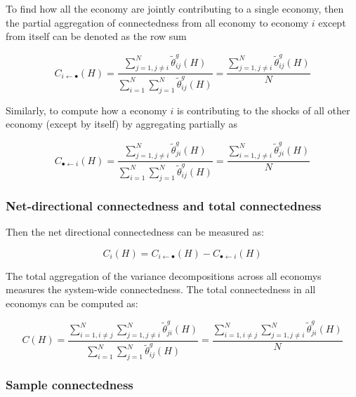 \documentclass[]{elsarticle} %
\begin{document}
To find how all the economy are jointly contributing to a single
economy, then the partial aggregation of connectedness from all economy
to economy \(i\) except from itself can be denoted as the row sum

\[{{C}_{i\leftarrow \bullet }}\left( H \right)=\frac{\sum\nolimits_{j=1,j\ne i}^{N}{\tilde{\theta }_{ij}^{g}\left( H \right)}}{\sum\nolimits_{i=1}^{N}{\sum\nolimits_{j=1}^{N}{\tilde{\theta }_{ij}^{g}\left( H \right)}}}=\frac{\sum\nolimits_{j=1,j\ne i}^{N}{\tilde{\theta }_{ij}^{g}\left( H \right)}}{N}\]

Similarly, to compute how a economy \(i\) is contributing to the shocks
of all other economy (except by itself) by aggregating partially as

\[{{C}_{\bullet \leftarrow i}}\left( H \right)=\frac{\sum\nolimits_{j=1,j\ne i}^{N}{\tilde{\theta }_{ji}^{g}\left( H \right)}}{\sum\nolimits_{i=1}^{N}{\sum\nolimits_{j=1}^{N}{\tilde{\theta }_{ij}^{g}\left( H \right)}}}=\frac{\sum\nolimits_{i=1,j\ne i}^{N}{\tilde{\theta }_{ji}^{g}\left( H \right)}}{N}\]

\subsubsection{\texorpdfstring{\textbf{Net-directional connectedness and
total
connectedness}}{Net-directional connectedness and total connectedness}}\label{net-directional-connectedness-and-total-connectedness}

Then the net directional connectedness can be measured as:

\[{{C}_{i}}\left( H \right)={{C}_{i\leftarrow \bullet }}\left( H \right)-{{C}_{\bullet \leftarrow i}}\left( H \right)\]

The total aggregation of the variance decompositions across all economys
measures the system-wide connectedness. The total connectedness in all
economys can be computed as:

\[C\left( H \right)=\frac{\sum\nolimits_{i=1,i\ne j}^{N}{\sum\nolimits_{j=1,j\ne i}^{N}{\tilde{\theta }_{ji}^{g}\left( H \right)}}}{\sum\nolimits_{i=1}^{N}{\sum\nolimits_{j=1}^{N}{\tilde{\theta }_{ij}^{g}\left( H \right)}}}=\frac{\sum\nolimits_{i=1,i\ne j}^{N}{\sum\nolimits_{j=1,j\ne i}^{N}{\tilde{\theta }_{ji}^{g}\left( H \right)}}}{N}\]

\subsubsection{\texorpdfstring{\textbf{Sample
connectedness}}{Sample connectedness}}\label{sample-connectedness}
\end{document}
